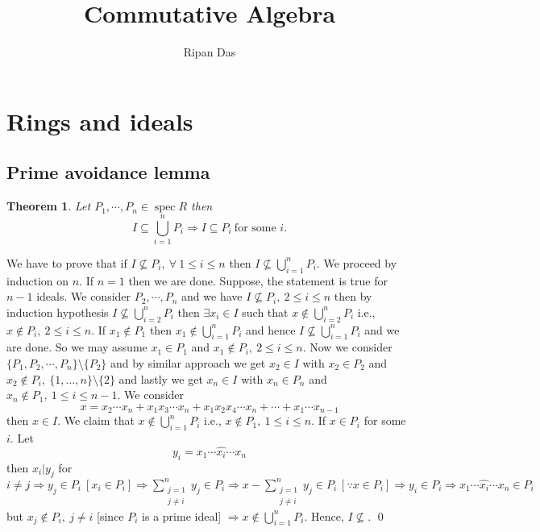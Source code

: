 \documentclass[11pt]{amsart}
\title[]{Commutative Algebra}
\author[]{Ripan Das}
\newtheorem{theorem}{Theorem}[section]
\begin{document}
\maketitle
\newpage 
\tableofcontents
\newpage

\section{Rings and ideals}

\subsection{Prime avoidance lemma}

\begin{theorem}

Let $P_1,\cdots ,P_n\in \operatorname{spec}R$ then $$I\subseteq \displaystyle\bigcup _{i=1}^n P_i \Rightarrow I\subseteq P_i~\text{for some $i$}.$$

\end{theorem}

\proof We have to prove that if $I\nsubseteq P_i,~\forall~1\leq i\leq n$ then $I\nsubseteq \displaystyle\bigcup_{i=1}^n P_i.$ We proceed by induction on $n.$ If $n=1$ then we are done. Suppose, the statement is true for $n-1$ ideals. We consider $P_2,\cdots ,P_n$ and we have $I\nsubseteq P_i,~2\leq i\leq n$ then by induction hypothesis $I\nsubseteq \displaystyle\bigcup_{i=2}^n P_i$ then $\exists x_i\in I$ such that $x\notin \displaystyle\bigcup_{i=2}^n P_i$ i.e., $x\notin P_i,~2\leq i\leq n.$ If $x_1\notin P_1$ then $x_1\notin \displaystyle\bigcup_{i=1}^n P_i$ and hence $I\nsubseteq \displaystyle\bigcup_{i=1}^n P_i$ and we are done. So we may assume $x_1\in P_1$ and $x_1\notin P_i,~2\leq i\leq n.$ Now we consider $\{P_1,P_2,\cdots ,P_n\}\setminus \{P_2\}$ and by similar approach we get $x_2\in I$ with $x_2\in P_2$ and $x_2\notin P_i,~\{1,\dots ,n\}\setminus \{2\}$ and lastly we get $x_n\in I$ with $x_n\in P_n$ and $x_n\notin P_1,~1\leq i\leq n-1.$ We consider $$x=x_2\cdots x_n+x_1x_3\cdots x_n+x_1x_2x_4\cdots x_n+\cdots +x_1\cdots x_{n-1}$$
then $x\in I.$ We claim that $x\notin \displaystyle\bigcup_{i=1}^n P_i$ i.e., $x\notin P_1,~1\leq i\leq n.$ If $x\in P_i$ for some $i.$ Let $$y_i=x_1\cdots \widehat{x_i}\cdots x_n$$ then $x_i|y_j$ for $i \neq j \Rightarrow y_j\in P_i ~[x_i\in P_i] \Rightarrow  \displaystyle\sum_{\substack{j=1\\ j\neq i}}^n y_j\in P_i \Rightarrow x-\displaystyle\sum_{\substack{j=1\\ j\neq i}}^n y_j\in P_i ~[\because x\in P_i] \Rightarrow y_i\in P_i \Rightarrow x_1\cdots \widehat{x_i}\cdots x_n\in P_i$ but $x_j\notin P_i,~j\neq i$ [since $P_i$ is a prime ideal] $\Rightarrow x\notin \displaystyle\bigcup_{i=1}^n P_i.$ Hence, $I\nsubseteq .$ \qed
\end{document}
